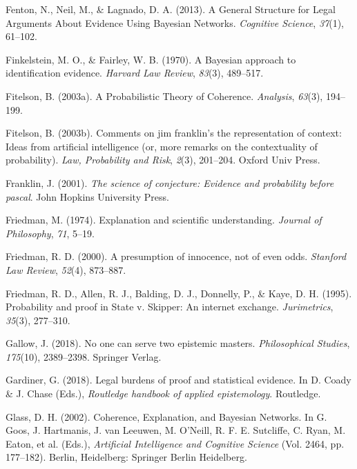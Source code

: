 \documentclass[11pt,dvipsnames,enabledeprecatedfontcommands]{scrartcl}
\begin{document}
\hypertarget{ref-fenton2013GeneralStructureLegal}{}
Fenton, N., Neil, M., \& Lagnado, D. A. (2013). A General Structure for
Legal Arguments About Evidence Using Bayesian Networks. \emph{Cognitive
Science}, \emph{37}(1), 61--102.

\hypertarget{ref-Finkelstein1970A}{}
Finkelstein, M. O., \& Fairley, W. B. (1970). A Bayesian approach to
identification evidence. \emph{Harvard Law Review}, \emph{83}(3),
489--517.

\hypertarget{ref-fitelson2003ProbabilisticTheoryCoherence}{}
Fitelson, B. (2003a). A Probabilistic Theory of Coherence.
\emph{Analysis}, \emph{63}(3), 194--199.

\hypertarget{ref-fitelson2003comments}{}
Fitelson, B. (2003b). Comments on jim franklin's the representation of
context: Ideas from artificial intelligence (or, more remarks on the
contextuality of probability). \emph{Law, Probability and Risk},
\emph{2}(3), 201--204. Oxford Univ Press.

\hypertarget{ref-Franklin2001}{}
Franklin, J. (2001). \emph{The science of conjecture: Evidence and
probability before pascal}. John Hopkins University Press.

\hypertarget{ref-friedman1974}{}
Friedman, M. (1974). Explanation and scientific understanding.
\emph{Journal of Philosophy}, \emph{71}, 5--19.

\hypertarget{ref-Friedman2000}{}
Friedman, R. D. (2000). A presumption of innocence, not of even odds.
\emph{Stanford Law Review}, \emph{52}(4), 873--887.

\hypertarget{ref-friedmanEtAl1995}{}
Friedman, R. D., Allen, R. J., Balding, D. J., Donnelly, P., \& Kaye, D.
H. (1995). Probability and proof in State v. Skipper: An internet
exchange. \emph{Jurimetrics}, \emph{35}(3), 277--310.

\hypertarget{ref-Gallow2018No}{}
Gallow, J. (2018). No one can serve two epistemic masters.
\emph{Philosophical Studies}, \emph{175}(10), 2389--2398. Springer
Verlag.

\hypertarget{ref-gardiner2018}{}
Gardiner, G. (2018). Legal burdens of proof and statistical evidence. In
D. Coady \& J. Chase (Eds.), \emph{Routledge handbook of applied
epistemology}. Routledge.

\hypertarget{ref-glass2002}{}
Glass, D. H. (2002). Coherence, Explanation, and Bayesian Networks. In
G. Goos, J. Hartmanis, J. van Leeuwen, M. O'Neill, R. F. E. Sutcliffe,
C. Ryan, M. Eaton, et al. (Eds.), \emph{Artificial Intelligence and
Cognitive Science} (Vol. 2464, pp. 177--182). Berlin, Heidelberg:
Springer Berlin Heidelberg.
\end{document}
